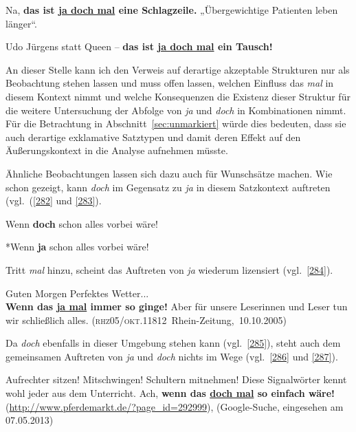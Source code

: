 {\begin{exe}
	\ex\label{280} 
	Na, \textbf{das ist \underline{ja doch mal} eine Schlagzeile.} „Übergewichtige Patienten leben länger“.
\end{exe}
\vspace{-0.4cm}
\begin{exe}
	\ex\label{281} 
	Udo Jürgens statt Queen – \textbf{das ist \underline{ja doch mal} ein Tausch!} 
\end{exe}
An dieser Stelle kann ich den Verweis auf derartige akzeptable Strukturen nur als Beobachtung stehen lassen und muss offen lassen, welchen Einfluss das \textit{mal} in diesem Kontext nimmt und welche Konsequenzen die Existenz dieser Struktur für die weitere Untersuchung der Abfolge von \textit{ja} und \textit{doch} in Kombinationen nimmt. Für die Betrachtung in Abschnitt~\ref{sec:unmarkiert} würde dies bedeuten, dass sie auch derartige exklamative Satztypen und damit deren Effekt auf den Äußerungskontext in die Analyse aufnehmen müsste.

Ähnliche Beobachtungen lassen sich dazu auch für Wunschsätze machen. Wie schon gezeigt, kann \textit{doch} im Gegensatz zu \textit{ja} in diesem Satzkontext auftreten (vgl.\ (\ref{282} und \ref{283}).

\begin{exe}
	\ex\label{282} 
	Wenn \textbf{doch} schon alles vorbei wäre!
	\hfill\hbox{\citet[140]{Hentschel1986}}
\end{exe}

\begin{exe}
	\ex\label{283} 
	*Wenn \textbf{ja} schon alles vorbei wäre!
\end{exe}
Tritt \textit{mal} hinzu, scheint das Auftreten von \textit{ja} wiederum lizensiert (vgl.\ \ref{284}).

\begin{exe}
	\ex\label{284} 
	Guten Morgen Perfektes Wetter...\\
	\textbf{Wenn das \underline{ja mal} immer so ginge!} Aber für unsere Leserinnen und Leser tun wir schließlich alles.
	\hfill\hbox{(\textsc{rhz05/okt.11812} Rhein-Zeitung, 10.10.2005)}	
\end{exe}
Da \textit{doch} ebenfalls in dieser Umgebung stehen kann (vgl.\ \ref{285}), steht auch dem gemeinsamen Auftreten von \textit{ja} und \textit{doch} nichts im Wege (vgl.\ \ref{286} und \ref{287}).
		
\begin{exe}
	\ex\label{285} 
	Aufrechter sitzen! Mitschwingen! Schultern mitnehmen! Diese Signalwörter kennt wohl jeder aus dem Unterricht. Ach, \textbf{wenn das \underline{doch 		mal} so einfach wäre!} 
	\newline
	{\scriptsize(\url{http://www.pferdemarkt.de/?page\_id=292999}), (Google-Suche, eingesehen am 07.05.2013)}
\end{exe}		

}
